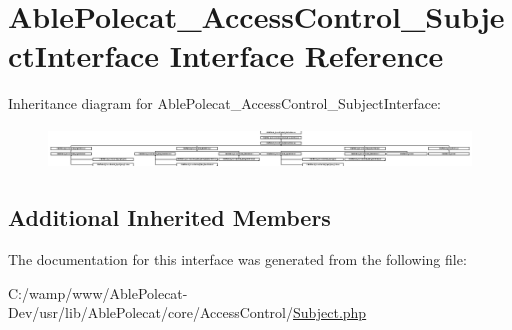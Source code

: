 \hypertarget{interface_able_polecat___access_control___subject_interface}{}\section{Able\+Polecat\+\_\+\+Access\+Control\+\_\+\+Subject\+Interface Interface Reference}
\label{interface_able_polecat___access_control___subject_interface}
Inheritance diagram for Able\+Polecat\+\_\+\+Access\+Control\+\_\+\+Subject\+Interface\+:\begin{figure}[H]
\begin{center}
\leavevmode
\includegraphics[height=1.091922cm]{interface_able_polecat___access_control___subject_interface}
\end{center}
\end{figure}
\subsection*{Additional Inherited Members}


The documentation for this interface was generated from the following file\+:\begin{DoxyCompactItemize}
\item 
C\+:/wamp/www/\+Able\+Polecat-\/\+Dev/usr/lib/\+Able\+Polecat/core/\+Access\+Control/\hyperlink{_subject_8php}{Subject.\+php}\end{DoxyCompactItemize}

